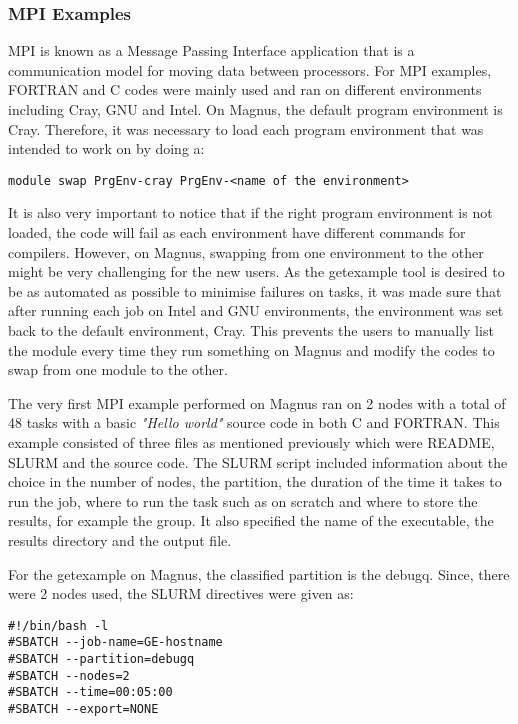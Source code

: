 \subsubsection{MPI Examples}

MPI is known as a Message Passing Interface application that is a communication model for moving data between processors. For MPI examples, FORTRAN and 
C codes were mainly used and ran on different environments including Cray, GNU and Intel. On Magnus, the default program environment is Cray. Therefore, 
it was necessary to load each program environment that was intended to work on by doing a:

\begin{tcolorbox}
\begin{Verbatim}[fontsize=\scriptsize]
module swap PrgEnv-cray PrgEnv-<name of the environment>
\end{Verbatim}
\end{tcolorbox}

It is also very important to notice that if the right program environment is not loaded, the code will fail as each environment have different commands 
for compilers. However, on Magnus, swapping from one environment to the other might be very challenging for the new users. As the getexample tool is
desired to be as automated as possible to minimise failures on tasks, it was made sure that after running each job on Intel and GNU environments, the
environment was set back to the default environment, Cray. This prevents the users to manually list the module every time they run something on Magnus
and modify the codes to swap from one module to the other. 

The very first MPI example performed on Magnus ran on 2 nodes with a total of 48 tasks with a basic \emph{"Hello world"} source code in both C and FORTRAN. 
This example consisted of three files as mentioned previously which were README, SLURM and the source code. The SLURM script included information about
the choice in the number of nodes, the partition, the duration of the time it takes to run the job, where to run the task such as on scratch and where
to store the results, for example the group. It also specified the name of the executable, the results directory and the output file. 

For the getexample on Magnus, the classified partition is the debugq. Since, there were 2 nodes used, the SLURM directives were given as:

\begin{tcolorbox}
\begin{Verbatim}[fontsize=\scriptsize]
#!/bin/bash -l
#SBATCH --job-name=GE-hostname
#SBATCH --partition=debugq
#SBATCH --nodes=2
#SBATCH --time=00:05:00
#SBATCH --export=NONE
\end{Verbatim}
\end{tcolorbox}

